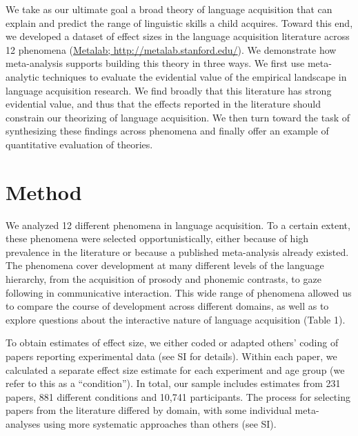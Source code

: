 \documentclass[english,floatsintext,man]{apa6}
\begin{document}
We take as our ultimate goal a broad theory of language acquisition that
can explain and predict the range of linguistic skills a child acquires.
Toward this end, we developed a dataset of effect sizes in the language
acquisition literature across 12 phenomena
(\href{http://metalab.stanford.edu}{Metalab;
http://metalab.stanford.edu/}). We demonstrate how meta-analysis
supports building this theory in three ways. We first use meta-analytic
techniques to evaluate the evidential value of the empirical landscape
in language acquisition research. We find broadly that this literature
has strong evidential value, and thus that the effects reported in the
literature should constrain our theorizing of language acquisition. We
then turn toward the task of synthesizing these findings across
phenomena and finally offer an example of quantitative evaluation of
theories.

\section{Method}\label{method}

We analyzed 12 different phenomena in language acquisition. To a certain
extent, these phenomena were selected opportunistically, either because
of high prevalence in the literature or because a published
meta-analysis already existed. The phenomena cover development at many
different levels of the language hierarchy, from the acquisition of
prosody and phonemic contrasts, to gaze following in communicative
interaction. This wide range of phenomena allowed us to compare the
course of development across different domains, as well as to explore
questions about the interactive nature of language acquisition (Table
1).

To obtain estimates of effect size, we either coded or adapted others'
coding of papers reporting experimental data (see SI for details).
Within each paper, we calculated a separate effect size estimate for
each experiment and age group (we refer to this as a
\enquote{condition}). In total, our sample includes estimates from 231
papers, 881 different conditions and 10,741 participants. The process
for selecting papers from the literature differed by domain, with some
individual meta-analyses using more systematic approaches than others
(see SI). \renewcommand{\arraystretch}{1.5}
\end{document}
